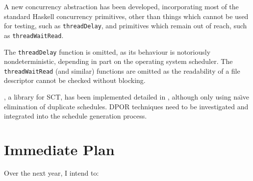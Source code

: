 A new concurrency abstraction has been developed, incorporating most
of the standard Haskell concurrency primitives, other than things
which cannot be used for testing, such as \verb|threadDelay|, and
primitives which remain out of reach, such as \verb|threadWaitRead|.

The \verb|threadDelay| function is omitted, as its behaviour is
notoriously nondeterministic, depending in part on the operating
system scheduler. The \verb|threadWaitRead| (and similar) functions
are omitted as the readability of a file descriptor cannot be checked
without blocking.

\dejafu{}, a library for SCT, has been implemented detailed in
, although only using na\"{\i}ve elimination of duplicate
schedules. DPOR techniques need to be investigated and integrated into
the schedule generation process.

\section{Immediate Plan}
\label{sec:proposal-plan}

Over the next year, I intend to:

